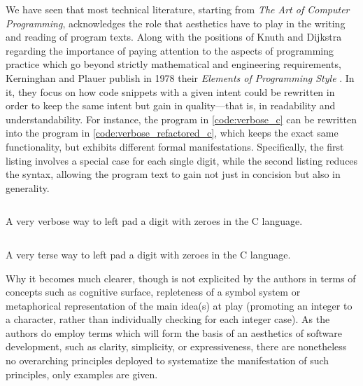 We have seen that most technical literature, starting from \emph{The Art of Computer Programming}, acknowledges the role that aesthetics have to play in the writing and reading of program texts. Along with the positions of Knuth and Dijkstra regarding the importance of paying attention to the aspects of programming practice \citep{dijkstra_chapter_1972} which go beyond strictly mathematical and engineering requirements, Kerninghan and Plauer publish in 1978 their \emph{Elements of Programming Style} \citep{kernighan_elements_1978}. In it, they focus on how code snippets with a given intent could be rewritten in order to keep the same intent but gain in quality—that is, in readability and understandability. For instance, the program in \ref{code:verbose_c} can be rewritten into the program in \ref{code:verbose_refactored_c}, which keeps the exact same functionality, but exhibits different formal manifestations. Specifically, the first listing involves a special case for each single digit, while the second listing reduces the syntax, allowing the program text to gain not just in concision but also in generality.

\begin{listing}
    \inputminted{c}{./corpus/verbose.c}
    \caption{A very verbose way to left pad a digit with zeroes in the C language.}
    \label{code:verbose_c}
\end{listing}

\begin{listing}
    \inputminted{c}{./corpus/verbose_refactored.c}
    \caption{A very terse way to left pad a digit with zeroes in the C language.}
    \label{code:verbose_refactored_c}
\end{listing}

Why it becomes much clearer, though is not explicited by the authors in terms of concepts such as cognitive surface, repleteness of a symbol system or metaphorical representation of the main idea(s) at play (promoting an integer to a character, rather than individually checking for each integer case). As the authors do employ terms which will form the basis of an aesthetics of software development, such as clarity, simplicity, or expressiveness, there are nonetheless no overarching principles deployed to systematize the manifestation of such principles, only examples are given.

